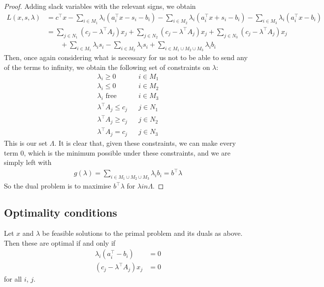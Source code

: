 \documentclass{../template/note}
\begin{document}
    \begin{proof}
        Adding slack variables with the relevant signs, we obtain
        \begin{align*}
            L(x, s, \lambda) &= c^\intercal x - \sum_{i \in M_1} \lambda_i (a_i^\intercal x - s_i - b_i) - \sum_{i \in M_2} \lambda_i (a_i^\intercal x + s_i - b_i) - \sum_{i \in M_3} \lambda_i (a_i^\intercal x - b_i) \\
            &= \sum_{j \in N_1} (c_j - \lambda^\intercal A_j)x_j + \sum_{j \in N_2} (c_j - \lambda^\intercal A_j)x_j + \sum_{j \in N_3} (c_j - \lambda^\intercal A_j)x_j \\ &\qquad + \sum_{i \in M_1} \lambda_i s_i - \sum_{i \in M_2} \lambda_i s_i + \sum_{i \in M_1 \cup M_2 \cup M_3} \lambda_i b_i
        \end{align*}
        Then, once again considering what is necessary for us not to be able to send any of the terms to infinity, we obtain the following set of constraints on $\lambda$:
        \begin{align*}
            \lambda_i \geq 0 && i \in M_1 \\
            \lambda_i \leq 0 && i \in M_2 \\
            \lambda_i \text{ free} && i \in M_3 \\
            \lambda^\intercal A_j \leq c_j && j \in N_1 \\
            \lambda^\intercal A_j \geq c_j && j \in N_2 \\
            \lambda^\intercal A_j = c_j && j \in N_3
        \end{align*}
        This is our set $\Lambda$. It is clear that, given these constraints, we can make every term 0, which is the minimum possible under these constraints, and we are simply left with
        \begin{align*}
            g(\lambda) = \sum_{i \in M_1 \cup M_2 \cup M_3} \lambda_i b_i = b^\intercal \lambda
        \end{align*}
        So the dual problem is to maximise $b^\intercal \lambda$ for $\lambda in \Lambda$.       
    \end{proof}
    
    \subsection{Optimality conditions}

    \begin{theorem}
        Let $x$ and $\lambda$ be feasible solutions to the primal problem and its duals as above. Then these are optimal if and only if
        \begin{align*}
            \lambda_i (a_i^\intercal - b_i) &= 0 \\
            (c_j - \lambda^\intercal A_j)x_j &= 0
        \end{align*}
        for all $i$, $j$.        
    \end{theorem}
    
\end{document}
